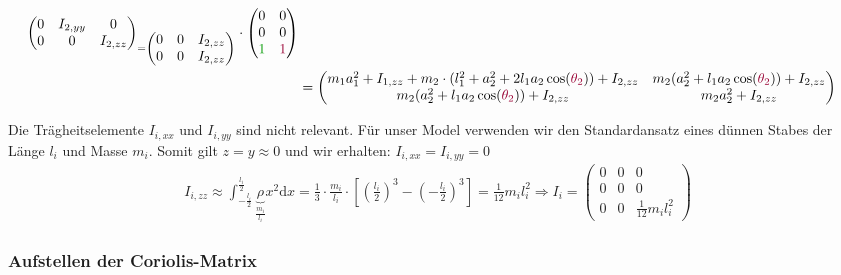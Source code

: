 \documentclass[a4paper, 12pt]{scrartcl}
\newcommand{\gruen}[2][gruen]{\textcolor{#1}{#2}}
\newcommand{\dunkelrot}[2][dunkelrot]{\textcolor{#1}{#2}}
\begin{document}
\begin{align*}
{\begin{pmatrix}
            0 & I_{2,yy} & 0 \\
            0 & 0 & I_{2,zz}
        \end{pmatrix}}_{
        = 
        \begin{pmatrix}
            0 & 0 & I_{2,zz} \\
            0 & 0 & I_{2,zz}
        \end{pmatrix}
    }   
    \cdot
    \begin{pmatrix}
        0 & 0 \\
        0 & 0 \\
        \gruen{1} & \dunkelrot{1}
    \end{pmatrix}
    \\
    &=
    \begin{pmatrix}
        m_1 a_1^2 + I_{1,zz} + m_2 \cdot (l_1^2 + a_2^2 + 2 l_1 a_2  \cos(\dunkelrot{\theta_{2}})) + I_{2,zz}
        & m_2 (a_2^2 + l_1 a_2  \cos(\dunkelrot{\theta_{2}})) +I_{2,zz}  \\
        m_2 (a_2^2 + l_1 a_2  \cos(\dunkelrot{\theta_{2}})) + I_{2,zz}
        & m_2 a_2^2 +I_{2,zz} 
    \end{pmatrix}
\end{align*}

Die Trägheitselemente $I_{i,xx}$ und $I_{i,yy}$ sind nicht relevant.
Für unser Model verwenden wir den Standardansatz eines 
dünnen Stabes der Länge $l_i$ und Masse $m_i$. 
Somit gilt $z= y \approx 0$ und wir erhalten: $I_{i,xx} = I_{i,yy} =0$
\begin{align*}
    I_{i,zz} \approx \int_{-\frac{l_{i}}{2}}^{\frac{l_{i}}{2}} 
    \underbrace{\rho}_{\frac{m_{i}}{l_{i}}} x^2 \mathrm{d}x
    = \frac{1}{3} \cdot \frac{m_{i}}{l_{i}} 
    \cdot 
    \left[ 
        \left( \frac{l_{i}}{2} \right)^3 -  \left( -\frac{l_{i}}{2} \right)^3 
    \right]
    = \frac{1}{12} m_{i} l_{i}^{2}
    \Rightarrow
    I_i     
    = 
    \begin{pmatrix}
        0 & 0 & 0 \\
        0 & 0 & 0 \\
        0 & 0 & \frac{1}{12} m_{i} l_{i}^{2}
    \end{pmatrix}
\end{align*}


\subsubsection{Aufstellen der Coriolis-Matrix}
\end{document}
